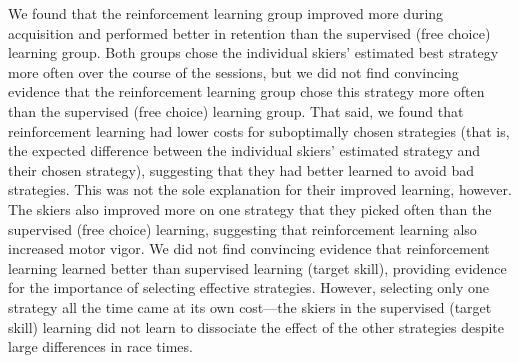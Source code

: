 \documentclass[pdflatex,sn-mathphys-num]{sn-jnl}%
\theoremstyle{thmstyleone}%
\theoremstyle{thmstyletwo}%
\theoremstyle{thmstylethree}%
\begin{document}
We found that the reinforcement learning group improved more during acquisition and performed better in retention than the supervised (free choice) learning group. Both groups chose the individual skiers' estimated best strategy more often over the course of the sessions, but we did not find convincing evidence that the reinforcement learning group chose this strategy more often than the supervised (free choice) learning group. That said, we found that reinforcement learning had lower costs for suboptimally chosen strategies (that is, the expected difference between the individual skiers' estimated strategy and their chosen strategy), suggesting that they had better learned to avoid bad strategies. This was not the sole explanation for their improved learning, however. The skiers also improved more on one strategy that they picked often than the supervised (free choice) learning, suggesting that reinforcement learning also increased motor vigor. We did not find convincing evidence that reinforcement learning learned better than supervised learning (target skill), providing evidence for the importance of selecting effective strategies.  However, selecting only one strategy all the time came at its own cost—the skiers in the supervised (target skill) learning did not learn to dissociate the effect of the other strategies despite large differences in race times. 
\end{document}
